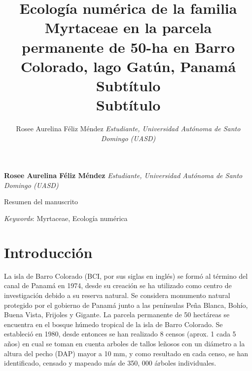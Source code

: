 \documentclass[11pt,]{article}
\title{Ecología numérica de la familia Myrtaceae en la parcela permanente de
50-ha en Barro Colorado, lago Gatún, Panamá\\
Subtítulo\\
Subtítulo  }
\author{\Large Rosee Aurelina Féliz Méndez\vspace{0.05in} \newline\normalsize\emph{Estudiante, Universidad Autónoma de Santo Domingo (UASD)}  }
\date{}
\newcommand*{\authorfont}{\fontfamily{phv}\selectfont}
\renewenvironment{abstract}
 {{%
    \setlength{\leftmargin}{0mm}
    \setlength{\rightmargin}{\leftmargin}%
  }%
  \relax}
 {\endlist}
\begin{document}
	
%

{%
\setlength{\parindent}{0pt}
\thispagestyle{plain}
{\fontsize{18}{20}\selectfont\raggedright 
\maketitle  %

}

{
   \vskip 13.5pt\relax \normalsize\fontsize{11}{12} 
\textbf{\authorfont Rosee Aurelina Féliz Méndez} \hskip 15pt \emph{\small Estudiante, Universidad Autónoma de Santo Domingo (UASD)}   

}

}








\begin{abstract}

    \hbox{\vrule height .2pt width 39.14pc}

    \vskip 8.5pt %

\noindent Resumen del manuscrito


\vskip 8.5pt \noindent \emph{Keywords}: Myrtaceae, Ecología numérica \par

    \hbox{\vrule height .2pt width 39.14pc}



\end{abstract}


\vskip 6.5pt


\noindent  \section{Introducción}\label{introducciuxf3n}

La isla de Barro Colorado (BCI, por sus siglas en inglés) se formó al
término del canal de Panamá en 1974, desde su creación se ha utilizado
como centro de investigación debido a su reserva natural. Se considera
monumento natural protegido por el gobierno de Panamá junto a las
penínsulas Peña Blanca, Bohío, Buena Vista, Frijoles y Gigante. La
parcela permanente de 50 hectáreas se encuentra en el bosque húmedo
tropical de la isla de Barro Colorado. Se estableció en 1980, desde
entonces se han realizado 8 censos (aprox. 1 cada 5 años) en cual se
toman en cuenta arboles de tallos leñosos con un diámetro a la altura
del pecho (DAP) mayor a 10 mm, y como resultado en cada censo, se han
identificado, censado y mapeado más de 350, 000 árboles individuales.
\end{document}
